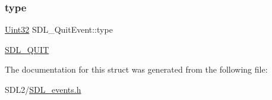 \subsubsection{\texorpdfstring{type}{type}}
{\footnotesize\ttfamily \hyperlink{_s_d_l__stdinc_8h_add440eff171ea5f55cb00c4a9ab8672d}{Uint32} S\+D\+L\+\_\+\+Quit\+Event\+::type}

\hyperlink{_s_d_l__events_8h_a3b589e89be6b35c02e0dd34a55f3fccaa31acc5fdafc86ebe2c1f5c3cae48d603}{S\+D\+L\+\_\+\+Q\+U\+IT} 

The documentation for this struct was generated from the following file\+:\begin{DoxyCompactItemize}
\item 
S\+D\+L2/\hyperlink{_s_d_l__events_8h}{S\+D\+L\+\_\+events.\+h}\end{DoxyCompactItemize}
